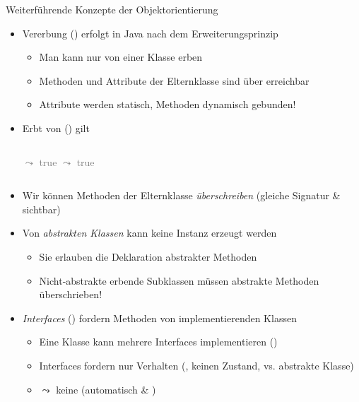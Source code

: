 {\begin{frame}[fragile,c]{Weiterführende Konzepte der Objektorientierung}
\vspace*{-.66\baselineskip}%
\begin{itemize}[<+(1)->]
    \itemsep4pt
    \item Vererbung () erfolgt in Java nach dem Erweiterungsprinzip \begin{itemize}
        \item Man kann nur von einer Klasse erben 
        \item Methoden und Attribute der Elternklasse sind über  erreichbar
        \item Attribute werden statisch, Methoden dynamisch gebunden!
    \end{itemize}
    \item Erbt  von  () gilt 
\begin{columns}[c]
 \textcolor{gray}{\scriptsize$\leadsto$ true}
 \textcolor{gray}{\scriptsize$\leadsto$ true}
\end{columns}
    \item Wir können Methoden der Elternklasse \textit{überschreiben} (gleiche Signatur \& sichtbar)
    \item Von \textit{abstrakten Klassen} kann keine Instanz erzeugt werden \begin{itemize}
        \item Sie erlauben die Deklaration abstrakter Methoden
        \item Nicht-abstrakte erbende Subklassen müssen abstrakte Methoden überschrieben!
    \end{itemize}
    \item \textit{Interfaces} () fordern Methoden von implementierenden Klassen \begin{itemize}
        \item Eine Klasse kann mehrere Interfaces implementieren ()
        \item Interfaces fordern nur Verhalten (, keinen Zustand, vs. abstrakte Klasse)
        \item $\leadsto$ keine  (automatisch  \& )
    \end{itemize}
\end{itemize}
\end{frame}
}\fi
\fi


\iffull\fi
